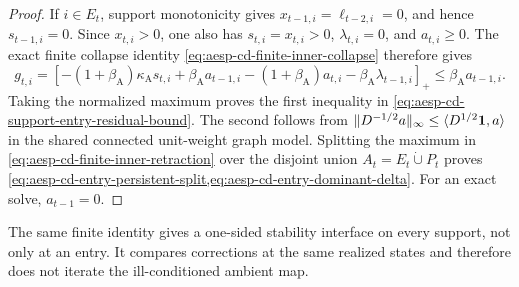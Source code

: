\begin{proof}
If $i\in E_t$, support monotonicity gives
$x_{t-1,i}=\ell_{t-2,i}=0$, and hence $s_{t-1,i}=0$.  Since $x_{t,i}>0$,
one also has $s_{t,i}=x_{t,i}>0$, $\lambda_{t,i}=0$, and $a_{t,i}\geq0$.
The exact finite collapse identity
\cref{eq:aesp-cd-finite-inner-collapse} therefore gives
\begin{equation*}
 g_{t,i}
 =\left[-(1+\beta_{\mathrm A})\kappa_{\mathrm A}s_{t,i}
       +\beta_{\mathrm A}a_{t-1,i}
       -(1+\beta_{\mathrm A})a_{t,i}
       -\beta_{\mathrm A}\lambda_{t-1,i}\right]_+
 \leq\beta_{\mathrm A}a_{t-1,i}.
\end{equation*}
Taking the normalized maximum proves the first inequality in
\cref{eq:aesp-cd-support-entry-residual-bound}.  The second follows from
$\lVert D^{-1/2}a\rVert_{\infty}\leq\langle D^{1/2}\mathbf{1},a\rangle$ in the shared
connected unit-weight graph model.  Splitting the maximum in
\cref{eq:aesp-cd-finite-inner-retraction} over the disjoint union
$A_t=E_t\mathbin{\dot\cup}P_t$ proves
\cref{eq:aesp-cd-entry-persistent-split,eq:aesp-cd-entry-dominant-delta}.
For an exact solve, $a_{t-1}=0$.
\end{proof}

The same finite identity gives a one-sided stability interface on every
support, not only at an entry.  It compares corrections at the same realized
states and therefore does not iterate the ill-conditioned ambient map.

